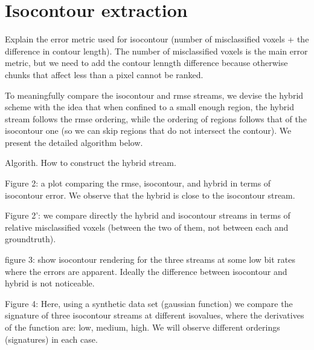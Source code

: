 
\section{Isocontour extraction}
Explain the error metric used for isocontour (number of misclassified voxels + the difference in contour length). The number of misclassified voxels is the main error metric, but we need to add the contour lenngth difference because otherwise chunks that affect less than a pixel cannot be ranked.

To meaningfully compare the isocontour and rmse streams, we devise the hybrid scheme with the idea that when confined to a small enough region, the hybrid stream follows the rmse ordering, while the ordering of regions follows that of the isocontour one (so we can skip regions that do not intersect the contour). We present the detailed algorithm below.

Algorith. How to construct the hybrid stream.

Figure 2: a plot comparing the rmse, isocontour, and hybrid in terms of isocontour error. We observe that the hybrid is close to the isocontour stream.

Figure 2': we compare directly the hybrid and isocontour streams in terms of relative misclassified voxels (between the two of them, not between each and groundtruth).

figure 3: show isocontour rendering for the three streams at some low bit rates where the errors are apparent. Ideally the difference between isocontour and hybrid is not noticeable.


Figure 4:
Here, using a synthetic data set (gaussian function) we compare the signature of three isocontour streams at different isovalues, where the derivatives of the function are: low, medium, high. We will observe different orderings (signatures) in each case.

